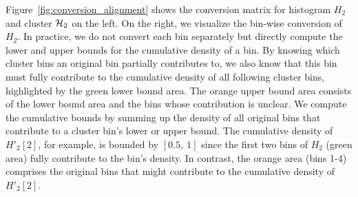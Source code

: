 Figure~\ref{fig:conversion_alignment} shows the conversion matrix for histogram $H_2$ and cluster $\mathcal{H}_2$ on the left.
On the right, we visualize the bin-wise conversion of $H_2$.
In practice, we do not convert each bin separately but directly compute the lower and upper bounds for the cumulative density of a bin.
By knowing which cluster bins an original bin partially contributes to, we also know that this bin must fully contribute to the cumulative density of all following cluster bins, highlighted by the green lower bound area.
The orange upper bound area consists of the lower bound area and the bins whose contribution is unclear.
We compute the cumulative bounds by summing up the density of all original bins that contribute to a cluster bin's lower or upper bound.
The cumulative density of $H'_2[2]$, for example, is bounded by $[0.5,\:1]$ since the first two bins of $H_2$ (green area) fully contribute to the bin's density.
In contrast, the orange area (bins 1-4) comprises the original bins that might contribute to the cumulative density of $H'_2[2]$.

